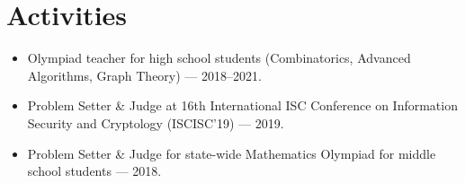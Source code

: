 \documentclass[11pt,a4paper]{article}
\begin{document}
\section{Activities}
\begin{itemize}
  \item Olympiad teacher for high school students (Combinatorics, Advanced
        Algorithms, Graph Theory) --- 2018--2021.
  \item Problem Setter \& Judge at 16th International ISC Conference on
        Information Security and Cryptology (ISCISC'19) --- 2019.
  \item Problem Setter \& Judge for state-wide Mathematics Olympiad for middle
        school students --- 2018.
\end{itemize}
\end{document}
